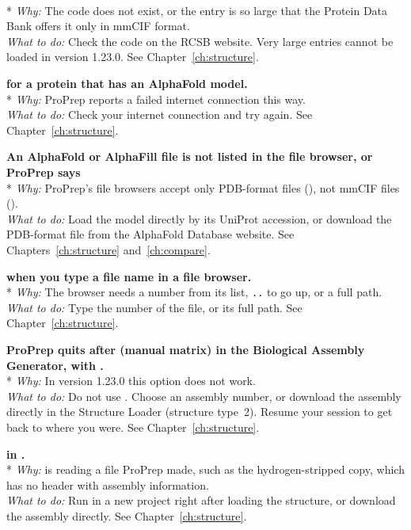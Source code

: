 {\bfseries {}}\\*
\emph{Why:} The code does not exist, or the entry is so large that the Protein
Data Bank offers it only in mmCIF format.\\
\emph{What to do:} Check the code on the RCSB website. Very large entries
cannot be loaded in version 1.23.0. See Chapter~\ref{ch:structure}.

{\bfseries {} for a protein that
has an AlphaFold model.}\\*
\emph{Why:} ProPrep reports a failed internet connection this way.\\
\emph{What to do:} Check your internet connection and try again. See
Chapter~\ref{ch:structure}.

{\bfseries An AlphaFold or AlphaFill file is not listed in the file browser,
or ProPrep says }\\*
\emph{Why:} ProPrep's file browsers accept only PDB-format files
(), not mmCIF files ().\\
\emph{What to do:} Load the model directly by its UniProt accession, or
download the PDB-format file from the AlphaFold Database website. See
Chapters~\ref{ch:structure} and~\ref{ch:compare}.

{\bfseries {} when you type a file
name in a file browser.}\\*
\emph{Why:} The browser needs a number from its list, \texttt{..} to go up,
or a full path.\\
\emph{What to do:} Type the number of the file, or its full path. See
Chapter~\ref{ch:structure}.

{\bfseries ProPrep quits after  (manual matrix) in the Biological
Assembly Generator, with .}\\*
\emph{Why:} In version 1.23.0 this option does not work.\\
\emph{What to do:} Do not use . Choose an assembly number, or download
the assembly directly in the Structure Loader (structure type~2). Resume your
session to get back to where you were. See Chapter~\ref{ch:structure}.

{\bfseries {} in .}\\*
\emph{Why:}  is reading a file ProPrep made, such as the
hydrogen-stripped copy, which has no header with assembly information.\\
\emph{What to do:} Run  in a new project right after loading the
structure, or download the assembly directly. See
Chapter~\ref{ch:structure}.

